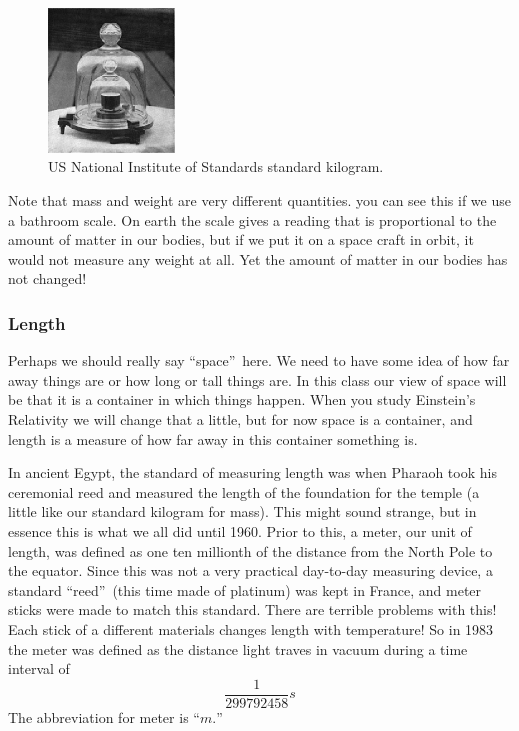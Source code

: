 \documentclass[]{Book}
\begin{document}
\begin{figure}[h]
	\begin{center}
		\includegraphics[width=0.3\textwidth]{Kilogram}			
		\caption{US National Institute of Standards standard kilogram.}
		\label{fig:kilogram}
	\end{center}
\end{figure}

Note that mass and weight are very different quantities. you can see this if
we use a bathroom scale. On earth the scale gives a reading that is
proportional to the amount of matter in our bodies, but if we put it on a
space craft in orbit, it would not measure any weight at all. Yet the amount
of matter in our bodies has not changed!%


\subsubsection{Length}

Perhaps we should really say \textquotedblleft space\textquotedblright\
here. We need to have some idea of how far away things are or how long or
tall things are. In this class our view of space will be that it is a
container in which things happen. When you study Einstein's Relativity we
will change that a little, but for now space is a container, and length is a
measure of how far away in this container something is.

In ancient Egypt, the standard of measuring length was when Pharaoh took his
ceremonial reed and measured the length of the foundation for the temple (a
little like our standard kilogram for mass). This might sound strange, but
in essence this is what we all did until 1960. Prior to this, a meter, our
unit of length, was defined as one ten millionth of the distance from the
North Pole to the equator. Since this was not a very practical day-to-day
measuring device, a standard \textquotedblleft reed\textquotedblright\ (this
time made of platinum) was kept in France, and meter sticks were made to
match this standard. There are terrible problems with this! Each stick of a
different materials changes length with temperature! So in 1983 the meter
was defined as the distance light traves in vacuum during a time interval of 
\begin{equation*}
	\frac{1}{299792458}\unit{s}
\end{equation*}%
The abbreviation for meter is \textquotedblleft $\unit{m}.$\textquotedblright
\end{document}

